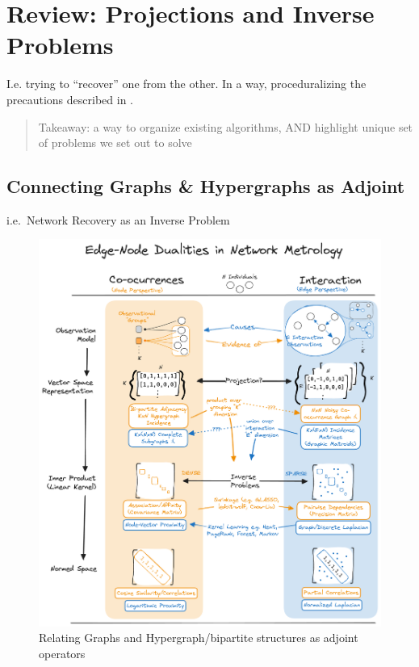 \documentclass[%
	12pt,
		oneside,
		letterpaper
]{book}
\begin{document}

\chapter{Review: Projections and Inverse
Problems}\label{review-projections-and-inverse-problems}

I.e. trying to ``recover'' one from the other. In a way, proceduralizing
the precautions described in \textcite{WhyHowWhen_Torres2021}.

\begin{quote}
Takeaway: a way to organize existing algorithms, AND highlight unique
set of problems we set out to solve
\end{quote}

\section{Connecting Graphs \& Hypergraphs as
Adjoint}\label{connecting-graphs-hypergraphs-as-adjoint}

i.e.~Network Recovery as an Inverse Problem

\begin{figure}[H]

{\centering \includegraphics{images/adjoint-cheatsheet.png}

}

\caption{Relating Graphs and Hypergraph/bipartite structures as adjoint
operators}

\end{figure}%
\end{document}
